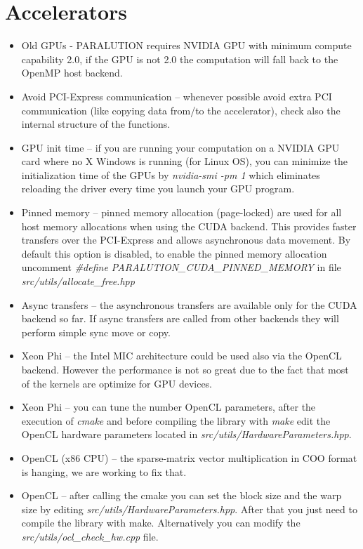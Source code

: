 \section{Accelerators}
\label{remark-accelerator}

\begin{itemize}
\itemsep0em

\item Old GPUs - PARALUTION requires NVIDIA GPU with minimum compute capability 2.0, if the GPU is not 2.0 the computation will fall back to the OpenMP host backend.

\item Avoid PCI-Express communication -- whenever possible avoid extra PCI communication (like copying data from/to the accelerator), check also the internal structure of the functions.   

\item GPU init time -- if you are running your computation on a NVIDIA GPU card where no X Windows is running (for Linux OS), you can minimize the initialization time of the GPUs by \emph{nvidia-smi -pm 1} which eliminates reloading the driver every time you launch your GPU program.

\item Pinned memory -- pinned memory allocation (page-locked) are used for all host memory allocations when using the CUDA backend. This provides faster transfers over the PCI-Express and allows asynchronous data movement. By default this option is disabled, to enable the pinned memory allocation uncomment \emph{\#define PARALUTION\_CUDA\_PINNED\_MEMORY} in file \emph{src/utils/allocate\_free.hpp}

\item Async transfers -- the asynchronous transfers are available only for the CUDA backend so far. If async transfers are called from other backends they will perform simple sync move or copy.

\item Xeon Phi -- the Intel MIC architecture could be used also via the OpenCL backend. However the performance is not so great due to the fact that most of the kernels are optimize for GPU devices.

\item Xeon Phi -- you can tune the number OpenCL parameters, after the execution of \emph{cmake} and before compiling the library with \emph{make} edit the OpenCL hardware parameters located in \emph{src/utils/HardwareParameters.hpp}.

\item OpenCL (x86 CPU) -- the sparse-matrix vector multiplication in COO format is hanging, we are working to fix that.

\item OpenCL -- after calling the cmake you can set the block size and the warp size by editing \emph{src/utils/HardwareParameters.hpp}. After that you just need to compile the library with make. Alternatively you can modify the \emph{src/utils/ocl\_check\_hw.cpp} file.

\end{itemize}

